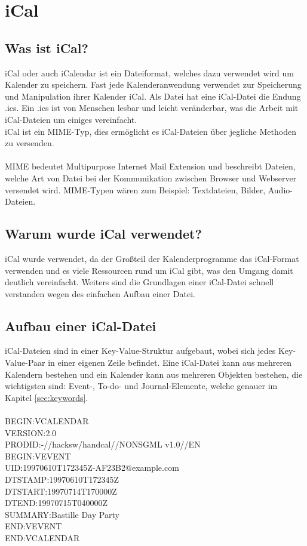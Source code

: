 \section{iCal}
\label{sec:iCal}

\subsection{Was ist iCal?}
\label{sec:wasIstiCal?}
iCal oder auch iCalendar ist ein Dateiformat, welches dazu verwendet wird um Kalender zu speichern. Fast jede Kalenderanwendung verwendet zur Speicherung und Manipulation ihrer Kalender iCal. Als Datei hat eine iCal-Datei die Endung .ics. Ein .ics ist von Menschen lesbar und leicht veränderbar, was die Arbeit mit iCal-Dateien um einiges vereinfacht. \\
iCal ist ein MIME-Typ, dies ermöglicht es iCal-Dateien über jegliche Methoden zu versenden.\\ \textcite{iCal-Basics} \\
MIME bedeutet Multipurpose Internet Mail Extension und beschreibt Dateien, welche Art von Datei bei der Kommunikation zwischen Browser und Webserver versendet wird. MIME-Typen wären zum Beispiel: Textdateien, Bilder, Audio-Dateien. \\ \textcite{MIME-Typ}


\subsection{Warum wurde iCal verwendet?}
\label{sec:warumWurdeiCalVerwendet?}
iCal wurde verwendet, da der Großteil der Kalenderprogramme das iCal-Format verwenden und es viele Ressourcen rund um iCal gibt, was den Umgang damit deutlich vereinfacht. Weiters sind die Grundlagen einer iCal-Datei schnell verstanden wegen des einfachen Aufbau einer Datei.

\subsection{Aufbau einer iCal-Datei}
\label{sec:aufbauEineriCalDatei}
iCal-Dateien sind in einer Key-Value-Struktur aufgebaut, wobei sich jedes Key-Value-Paar in einer eigenen Zeile befindet. Eine iCal-Datei kann aus mehreren Kalendern bestehen und ein Kalender kann aus mehreren Objekten bestehen, die wichtigsten sind: Event-, To-do- und Journal-Elemente, welche genauer im Kapitel \ref{sec:keywords}. \\ \\
 BEGIN:VCALENDAR\\
 VERSION:2.0\\
 PRODID:-//hacksw/handcal//NONSGML v1.0//EN\\
 BEGIN:VEVENT\\
 UID:19970610T172345Z-AF23B2@example.com\\
 DTSTAMP:19970610T172345Z\\
 DTSTART:19970714T170000Z\\
 DTEND:19970715T040000Z\\
 SUMMARY:Bastille Day Party\\
 END:VEVENT\\
 END:VCALENDAR

